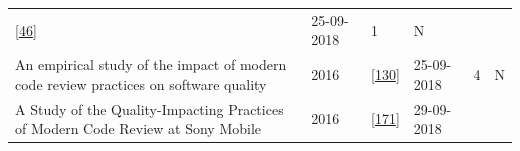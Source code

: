 \documentclass[]{book}
\begin{document}
\begin{longtable}[]{@{}llllll@{}}
\begin{minipage}[t]{0.13\columnwidth}
{[}\protect\hyperlink{ref-cohen2010modern}{46}{]}\strut
\end{minipage} & \begin{minipage}[t]{0.06\columnwidth}\raggedright\strut
25-09-2018\strut
\end{minipage} & \begin{minipage}[t]{0.07\columnwidth}\raggedright\strut
1\strut
\end{minipage} & \begin{minipage}[t]{0.08\columnwidth}\raggedright\strut
N\strut
\end{minipage}\tabularnewline
\begin{minipage}[t]{0.47\columnwidth}\raggedright\strut
An empirical study of the impact of modern code review practices on
software quality\strut
\end{minipage} & \begin{minipage}[t]{0.03\columnwidth}\raggedright\strut
2016\strut
\end{minipage} & \begin{minipage}[t]{0.13\columnwidth}\raggedright\strut
{[}\protect\hyperlink{ref-mcintosh2016empirical}{130}{]}\strut
\end{minipage} & \begin{minipage}[t]{0.06\columnwidth}\raggedright\strut
25-09-2018\strut
\end{minipage} & \begin{minipage}[t]{0.07\columnwidth}\raggedright\strut
4\strut
\end{minipage} & \begin{minipage}[t]{0.08\columnwidth}\raggedright\strut
N\strut
\end{minipage}\tabularnewline
\begin{minipage}[t]{0.47\columnwidth}\raggedright\strut
A Study of the Quality-Impacting Practices of Modern Code Review at Sony
Mobile\strut
\end{minipage} & \begin{minipage}[t]{0.03\columnwidth}\raggedright\strut
2016\strut
\end{minipage} & \begin{minipage}[t]{0.13\columnwidth}\raggedright\strut
{[}\protect\hyperlink{ref-shimagaki2016study}{171}{]}\strut
\end{minipage} & \begin{minipage}[t]{0.06\columnwidth}\raggedright\strut
29-09-2018\strut
\end{minipage} & \begin{minipage}[t]{0.07\columnwidth}\raggedright\strut

\end{minipage}
\end{longtable}
\end{document}
